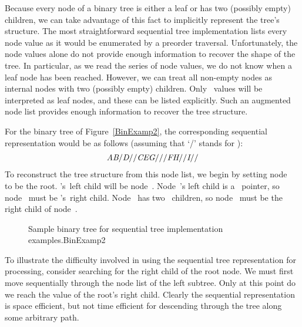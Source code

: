Because every node of a binary tree is either a leaf or has two
(possibly empty) children, we can take advantage of this fact to
implicitly represent the tree's structure.
The most straightforward sequential tree implementation lists every
node value as it would be enumerated by a preorder traversal.
Unfortunately, the node values alone do not provide enough information 
to recover the shape of the tree.
In particular, as we read the series of node values, we do not
know when a leaf node has been reached.
However, we can treat all non-empty nodes as internal nodes with two
(possibly empty) children.
Only \NULL\ values will be interpreted as leaf nodes, and these can be 
listed explicitly.
Such an augmented node list provides enough information to recover
the tree structure.

\begin{example}
\label{Serialbinone}
For the binary tree of Figure~\ref{BinExamp2},
the corresponding sequential representation would be as follows
(assuming that `/' stands for \NULL):
\begin{eqnarray}
{\textit{A}} {\textit{B}} / {\textit{D}} / / {\textit{C}} {\textit{E}} {\textit{G}} / / /
{\textit{F}} {\textit{H}} / / {\textit{I}} / /\label{SeqEqOne}
\end{eqnarray}
To reconstruct the tree structure from this node list, we begin by
setting node~ to be the root.
's~left child will be node~.
Node~'s left child is a \NULL\ pointer, so node~ must
be 's~right child.
Node~ has two \NULL\ children, so node~ must be the
right child of node~.
\end{example}

\begin{figure}
\vspace{-\bigskipamount}\vspace{-\medskipamount}

{Sample binary tree for sequential tree implementation
examples.}{BinExamp2}
\medskip
\end{figure}

To illustrate the difficulty involved in using the sequential tree
representation for processing, consider searching for the right child
of the root node.
We must first move sequentially through the node list of the left
subtree.
Only at this point do we reach the value of the root's right child.
Clearly the sequential representation is space efficient, but not time
efficient for descending through the tree along some arbitrary path.

